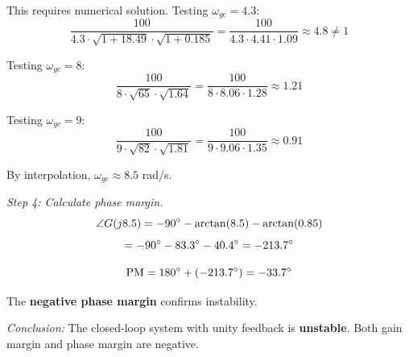 \begin{examplebox}
This requires numerical solution. Testing $\omega_{gc} = 4.3$:
\begin{equation}
\frac{100}{4.3 \cdot \sqrt{1+18.49} \cdot \sqrt{1+0.185}} = \frac{100}{4.3 \cdot 4.41 \cdot 1.09} \approx 4.8 \neq 1
\end{equation}

Testing $\omega_{gc} = 8$:
\begin{equation}
\frac{100}{8 \cdot \sqrt{65} \cdot \sqrt{1.64}} = \frac{100}{8 \cdot 8.06 \cdot 1.28} \approx 1.21
\end{equation}

Testing $\omega_{gc} = 9$:
\begin{equation}
\frac{100}{9 \cdot \sqrt{82} \cdot \sqrt{1.81}} = \frac{100}{9 \cdot 9.06 \cdot 1.35} \approx 0.91
\end{equation}

By interpolation, $\omega_{gc} \approx 8.5$ rad/s.

\textit{Step 4: Calculate phase margin.}
\begin{equation}
\angle G(j8.5) = -90^\circ - \arctan(8.5) - \arctan(0.85)
\end{equation}
\begin{equation}
= -90^\circ - 83.3^\circ - 40.4^\circ = -213.7^\circ
\end{equation}

\begin{equation}
\text{PM} = 180^\circ + (-213.7^\circ) = -33.7^\circ
\end{equation}

The \textbf{negative phase margin} confirms instability.

\textit{Conclusion:} The closed-loop system with unity feedback is \textbf{unstable}. Both gain margin and phase margin are negative.
\end{examplebox}

